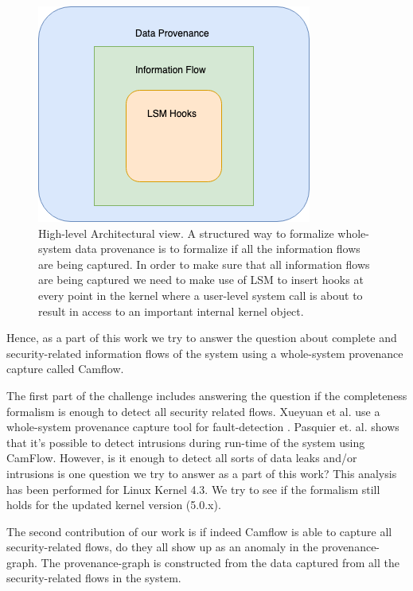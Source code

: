\documentclass{IEEEtran}
\begin{document}
\begin{figure}
	\centering
	\includegraphics[width=0.7\linewidth]{Architecture-diagram}
	\caption[]{High-level Architectural view. A structured way to formalize whole-system data provenance is to formalize if all the information flows are being captured. In order to make sure that all information flows are being captured we need to make use of LSM to insert hooks at every point in the kernel where a user-level system call is about to result in access to an important internal kernel object.}
	\label{fig:architecture-diagram}
\end{figure}







Hence, as a part of this work we try to answer the question about complete and security-related information flows of the system using a whole-system provenance capture called Camflow.\cite{b7}

The first part of the challenge includes answering the question if the completeness formalism is enough to detect all security related flows. Xueyuan et al. use a whole-system provenance capture tool for fault-detection \cite{b8}. Pasquier et. al. \cite{b6} shows that it's possible to detect intrusions during run-time of the system using CamFlow. However, is it enough to detect all sorts of data leaks and/or intrusions is one question we try to answer as a part of this work? This analysis has been performed for Linux Kernel 4.3. We try to see if the formalism still holds for the updated kernel version (5.0.x).

The second contribution of our work is if indeed Camflow \cite{b7}  is able to capture all security-related flows, do they all show up as an anomaly in the provenance-graph. The provenance-graph is constructed from the data captured from all the security-related flows in the system. 
\end{document}
